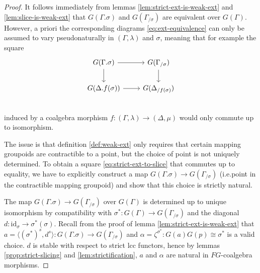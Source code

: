 \documentclass[a4paper]{article}
\theoremstyle{remark}
\theoremstyle{definition}
\begin{document}
\begin{proof}
  It follows immediately from lemmas \ref{lem:strict-ext-is-weak-ext} and \ref{lem:slice-is-weak-ext} that $G(\Gamma.\sigma)$ and $G(\Gamma_{/ \sigma})$ are equivalent over $G(\Gamma)$.
  However, a priori the corresponding diagrams \eqref{eq:ext-equivalence} can only be assumed to vary pseudonaturally in $(\Gamma, \lambda)$ and $\sigma$, meaning that for example the square
  \begin{equation}
    \label{eq:strict-ext-to-slice}
    \begin{tikzcd}
      G(\Gamma.\sigma) \arrow[r] \arrow[d] & G(\Gamma_{/ \sigma}) \arrow[d] \\
      G(\Delta.f(\sigma)) \arrow[r] & G(\Delta_{/ f(\sigma)}) \\
    \end{tikzcd}
  \end{equation}
  induced by a coalgebra morphism $f : (\Gamma, \lambda) \rightarrow (\Delta, \mu)$ would only commute up to isomorphism.

  The issue is that definition \ref{def:weak-ext} only requires that certain mapping groupoids are contractible to a point, but the choice of point is not uniquely determined.
  To obtain a square \eqref{eq:strict-ext-to-slice} that commutes up to equality, we have to explicitly construct a map $G(\Gamma.\sigma) \rightarrow G(\Gamma_{/ \sigma})$ (i.e.\@ point in the contractible mapping groupoid) and show that this choice is strictly natural.

  The map $G(\Gamma.\sigma) \rightarrow G(\Gamma_{/ \sigma})$ over $G(\Gamma)$ is determined up to unique isomorphism by compatibility with $\sigma^* : G(\Gamma) \rightarrow G(\Gamma_{/ \sigma})$ and the diagonal $d : \mathrm{id}_\sigma \rightarrow \sigma^*(\sigma)$.
  Recall from the proof of lemma \ref{lem:strict-ext-is-weak-ext} that $a = \langle (\sigma^*)^s, d^s \rangle : G(\Gamma.\sigma) \rightarrow G(\Gamma_{/ \sigma})$ and $\alpha = \zeta^{\sigma^*} : G(a) G(p) \cong \sigma^*$ is a valid choice.
  $d$ is stable with respect to strict lcc functors, hence by lemmas \ref{prop:strict-slicing} and \ref{lem:strictification}, $a$ and $\alpha$ are natural in $FG$-coalgebra morphisms.


\end{proof}
\end{document}

